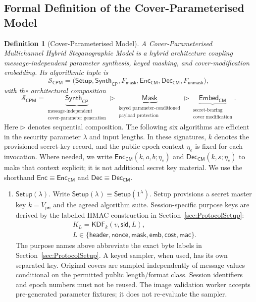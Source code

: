 \documentclass[pdflatex,sn-mathphys-num]{sn-jnl}%
\theoremstyle{definition}
\newtheorem{definition}{Definition}[section]
\theoremstyle{game}
\theoremstyle{thmstyleone}%
\theoremstyle{thmstyletwo}%
\theoremstyle{thmstylethree}%
\begin{document}
\subsection{Formal Definition of the Cover-Parameterised Model}\label{hybrid_model}
\begin{definition}[Cover-Parameterised Model]\label{definition_Hybrid_stego}
\emph{A Cover-Parameterised Multichannel Hybrid Steganographic Model is a
hybrid architecture coupling message-independent parameter synthesis,
keyed masking, and cover-modification embedding. Its algorithmic tuple is}
\[
\mathcal S_{\mathsf{CPM}}=
\bigl(\mathsf{Setup},\mathsf{Synth}_{\mathsf{CP}},F_{\mathsf{mask}},
\mathsf{Enc}_{\mathsf{CM}},\mathsf{Dec}_{\mathsf{CM}},F_{\mathsf{unmask}}\bigr),
\]
\emph{with the architectural composition}
\[
\mathcal S_{\mathsf{CPM}}=
\underbrace{\mathsf{Synth}_{\mathsf{CP}}}_{\substack{\text{message-independent}\\\text{cover-parameter generation}}}
\triangleright
\underbrace{\mathsf{Mask}}_{\substack{\text{keyed parameter-conditioned}\\\text{payload protection}}}
\triangleright
\underbrace{\mathsf{Embed}_{\mathsf{CM}}}_{\substack{\text{secret-bearing}\\\text{cover modification}}}.
\]
Here $\triangleright$ denotes sequential composition. The following six
algorithms are efficient in the security parameter $\lambda$ and input
lengths. In these signatures, $k$ denotes the provisioned
secret-key record, and the public epoch context $\eta_e$ is fixed for each
invocation. Where needed, we write $\mathsf{Enc}_{\mathsf{CM}}(k,o,b;\eta_e)$
and $\mathsf{Dec}_{\mathsf{CM}}(k,s;\eta_e)$ to make that context explicit;
it is not additional secret key material. We use the shorthand
$\mathsf{Enc}\equiv\mathsf{Enc}_{\mathsf{CM}}$ and
$\mathsf{Dec}\equiv\mathsf{Dec}_{\mathsf{CM}}$.
\begin{enumerate}[label=(\Alph*),leftmargin=2em]
\item $\boldsymbol{\mathsf{Setup}}(\lambda)$.
Write $\mathsf{Setup}(\lambda)\equiv\mathsf{Setup}(1^\lambda)$.
Setup provisions a secret master key $k=V_{\mathsf{pri}}$ and the agreed
algorithm suite. Session-specific purpose keys are derived by the labelled
HMAC construction in Section~\ref{sec:ProtocolSetup}:
\[
\begin{gathered}
K_L=\mathsf{KDF}_{k}(v,\mathsf{sid},L),\qquad\\
L\in\{\mathsf{header},\mathsf{nonce},\mathsf{mask},\mathsf{emb},
\mathsf{cost},\mathsf{mac}\}.
\end{gathered}
\]
The purpose names above abbreviate the exact byte labels in Section~\ref{sec:ProtocolSetup}. A keyed sampler, when used, has its own separated key. Original covers
are sampled independently of message values conditional on the permitted
public length/format class. Session identifiers
and epoch numbers must not be reused. The image validation worker accepts
pre-generated parameter fixtures; it does not re-evaluate the sampler.


\end{enumerate}
\end{definition}
\end{document}
